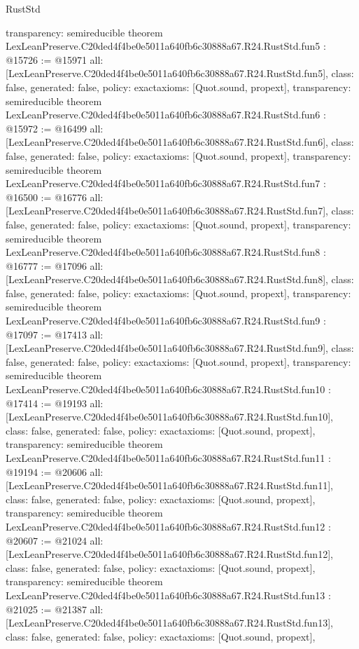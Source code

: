 \begin{lexlean}{RustStd}
\begin{coremodule}
{  transparency: semireducible
}
theorem LexLeanPreserve.C20ded4f4be0e5011a640fb6c30888a67.R24.RustStd.fun5 : @15726 := @15971 {
  all: [LexLeanPreserve.C20ded4f4be0e5011a640fb6c30888a67.R24.RustStd.fun5],
  class: false,
  generated: false,
  policy: exact{axioms: [Quot.sound, propext]},
  transparency: semireducible
}
theorem LexLeanPreserve.C20ded4f4be0e5011a640fb6c30888a67.R24.RustStd.fun6 : @15972 := @16499 {
  all: [LexLeanPreserve.C20ded4f4be0e5011a640fb6c30888a67.R24.RustStd.fun6],
  class: false,
  generated: false,
  policy: exact{axioms: [Quot.sound, propext]},
  transparency: semireducible
}
theorem LexLeanPreserve.C20ded4f4be0e5011a640fb6c30888a67.R24.RustStd.fun7 : @16500 := @16776 {
  all: [LexLeanPreserve.C20ded4f4be0e5011a640fb6c30888a67.R24.RustStd.fun7],
  class: false,
  generated: false,
  policy: exact{axioms: [Quot.sound, propext]},
  transparency: semireducible
}
theorem LexLeanPreserve.C20ded4f4be0e5011a640fb6c30888a67.R24.RustStd.fun8 : @16777 := @17096 {
  all: [LexLeanPreserve.C20ded4f4be0e5011a640fb6c30888a67.R24.RustStd.fun8],
  class: false,
  generated: false,
  policy: exact{axioms: [Quot.sound, propext]},
  transparency: semireducible
}
theorem LexLeanPreserve.C20ded4f4be0e5011a640fb6c30888a67.R24.RustStd.fun9 : @17097 := @17413 {
  all: [LexLeanPreserve.C20ded4f4be0e5011a640fb6c30888a67.R24.RustStd.fun9],
  class: false,
  generated: false,
  policy: exact{axioms: [Quot.sound, propext]},
  transparency: semireducible
}
theorem LexLeanPreserve.C20ded4f4be0e5011a640fb6c30888a67.R24.RustStd.fun10 : @17414 := @19193 {
  all: [LexLeanPreserve.C20ded4f4be0e5011a640fb6c30888a67.R24.RustStd.fun10],
  class: false,
  generated: false,
  policy: exact{axioms: [Quot.sound, propext]},
  transparency: semireducible
}
theorem LexLeanPreserve.C20ded4f4be0e5011a640fb6c30888a67.R24.RustStd.fun11 : @19194 := @20606 {
  all: [LexLeanPreserve.C20ded4f4be0e5011a640fb6c30888a67.R24.RustStd.fun11],
  class: false,
  generated: false,
  policy: exact{axioms: [Quot.sound, propext]},
  transparency: semireducible
}
theorem LexLeanPreserve.C20ded4f4be0e5011a640fb6c30888a67.R24.RustStd.fun12 : @20607 := @21024 {
  all: [LexLeanPreserve.C20ded4f4be0e5011a640fb6c30888a67.R24.RustStd.fun12],
  class: false,
  generated: false,
  policy: exact{axioms: [Quot.sound, propext]},
  transparency: semireducible
}
theorem LexLeanPreserve.C20ded4f4be0e5011a640fb6c30888a67.R24.RustStd.fun13 : @21025 := @21387 {
  all: [LexLeanPreserve.C20ded4f4be0e5011a640fb6c30888a67.R24.RustStd.fun13],
  class: false,
  generated: false,
  policy: exact{axioms: [Quot.sound, propext]},
}
\end{coremodule}
\end{lexlean}
